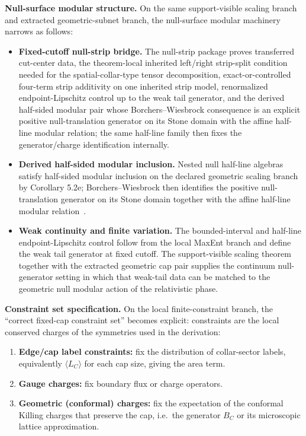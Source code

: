 \textbf{Null-surface modular structure.} On the same support-visible scaling branch and extracted geometric-subnet branch, the null-surface modular machinery narrows as follows:
\begin{itemize}
\item
\textbf{Fixed-cutoff null-strip bridge.} The null-strip package proves transferred cut-center data, the theorem-local inherited left/right strip-split condition needed for the spatial-collar-type tensor decomposition, exact-or-controlled four-term strip additivity on one inherited strip model, renormalized endpoint-Lipschitz control up to the weak tail generator, and the derived half-sided modular pair whose Borchers--Wiesbrock consequence is an explicit positive null-translation generator on its Stone domain with the affine half-line modular relation; the same half-line family then fixes the generator/charge identification internally.
\item
\textbf{Derived half-sided modular inclusion.} Nested null half-line algebras satisfy half-sided modular inclusion on the declared geometric scaling branch by Corollary 5.2e; Borchers--Wiesbrock then identifies the positive null-translation generator on its Stone domain together with the affine half-line modular relation~\cite{wiesbrock93}.
\item
\textbf{Weak continuity and finite variation.} The bounded-interval and half-line endpoint-Lipschitz control follow from the local MaxEnt branch and define the weak tail generator at fixed cutoff. The support-visible scaling theorem together with the extracted geometric cap pair supplies the continuum null-generator setting in which that weak-tail data can be matched to the geometric null modular action of the relativistic phase.
\end{itemize}

\textbf{Constraint set specification.} On the local finite-constraint branch, the ``correct fixed-cap constraint set'' becomes explicit: constraints are the local conserved charges of the symmetries used in the derivation:
\begin{enumerate}
\def\labelenumi{\arabic{enumi}.}
\item
\textbf{Edge/cap label constraints:} fix the distribution of collar-sector labels, equivalently \(\langle L_C\rangle\) for each cap size, giving the area term.
\item
\textbf{Gauge charges:} fix boundary flux or charge operators.
\item
\textbf{Geometric (conformal) charges:} fix the expectation of the conformal Killing charges that preserve the cap, i.e.\ the generator \(B_C\) or its microscopic lattice approximation.
\end{enumerate}

